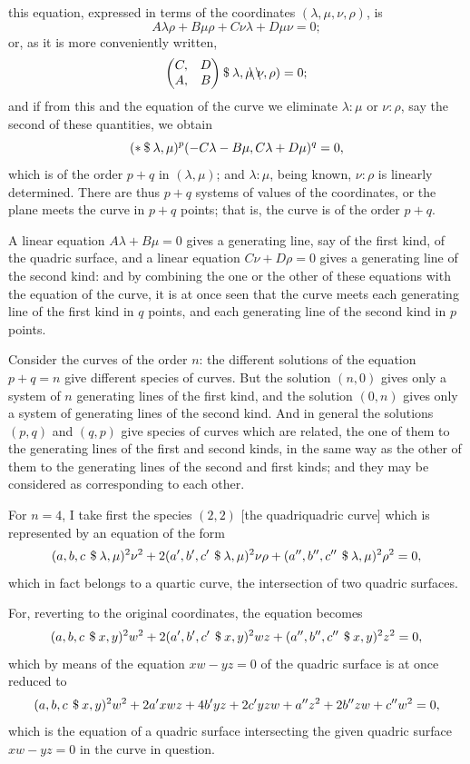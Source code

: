 \documentclass[11pt,a4paper]{article}
\theoremstyle{plain}
\begin{document}
\newpage
this equation, expressed in terms of the coordinates $(\lambda, \mu, \nu, \rho)$, is
\[
A\lambda\rho + B\mu\rho + C\nu\lambda + D\mu\nu = 0;
\]
or, as it is more conveniently written,
\[
\begin{pmatrix} C, & D \\ A, & B \end{pmatrix} \mathbin{\char`\$} \lambda, \mu \, \backslash \! \! \! \! \! \! \backslash \, \nu, \rho) = 0;
\]
and if from this and the equation of the curve we eliminate $\lambda : \mu$ or $\nu : \rho$, say the second of these quantities, we obtain
\[
(* \mathbin{\char`\$} \lambda, \mu)^p (-C\lambda - B\mu, C\lambda + D\mu)^q = 0,
\]
which is of the order $p + q$ in $(\lambda, \mu)$; and $\lambda : \mu$, being known, $\nu : \rho$ is linearly determined. There are thus $p + q$ systems of values of the coordinates, or the plane meets the curve in $p + q$ points; that is, the curve is of the order $p+q$.

A linear equation $A\lambda + B\mu = 0$ gives a generating line, say of the first kind, of the quadric surface, and a linear equation $C\nu + D\rho = 0$ gives a generating line of the second kind: and by combining the one or the other of these equations with the equation of the curve, it is at once seen that the curve meets each generating line of the first kind in $q$ points, and each generating line of the second kind in $p$ points.

Consider the curves of the order $n$: the different solutions of the equation $p + q = n$ give different species of curves. But the solution $(n, 0)$ gives only a system of $n$ generating lines of the first kind, and the solution $(0, n)$ gives only a system of generating lines of the second kind. And in general the solutions $(p, q)$ and $(q, p)$ give species of curves which are related, the one of them to the generating lines of the first and second kinds, in the same way as the other of them to the generating lines of the second and first kinds; and they may be considered as corresponding to each other.

For $n = 4$, I take first the species $(2, 2)$ [the quadriquadric curve] which is represented by an equation of the form
\[
(a, b, c \, \mathbin{\char`\$} \lambda, \mu)^2 \nu^2 + 2(a', b', c' \, \mathbin{\char`\$} \lambda, \mu)^2 \nu\rho + (a'', b'', c'' \, \mathbin{\char`\$} \lambda, \mu)^2 \rho^2 = 0,
\]
which in fact belongs to a quartic curve, the intersection of two quadric surfaces.

For, reverting to the original coordinates, the equation becomes
\[
(a, b, c \, \mathbin{\char`\$} x, y)^2 w^2 + 2(a', b', c' \, \mathbin{\char`\$} x, y)^2 wz + (a'', b'', c'' \, \mathbin{\char`\$} x, y)^2 z^2 = 0,
\]
which by means of the equation $xw - yz = 0$ of the quadric surface is at once reduced to
\[
(a, b, c \, \mathbin{\char`\$} x, y)^2 w^2 + 2a'xwz + 4b'yz + 2c'yzw + a''z^2 + 2b''zw + c''w^2 = 0,
\]
which is the equation of a quadric surface intersecting the given quadric surface $xw - yz = 0$ in the curve in question.
\end{document}
